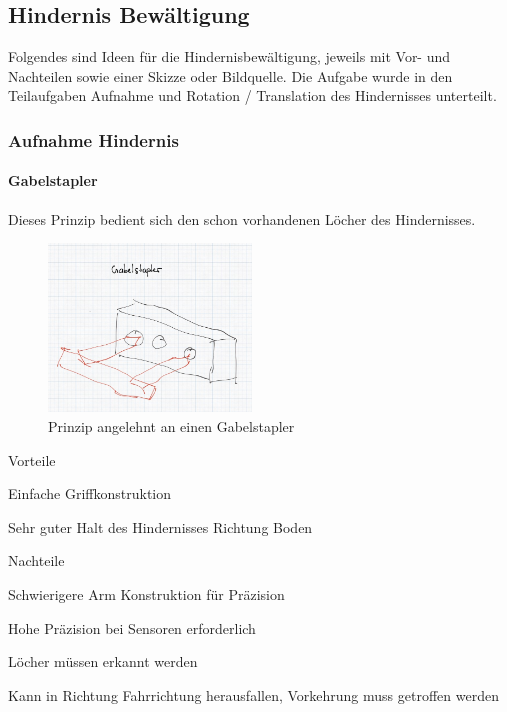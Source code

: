 \documentclass[../main.tex]{subfiles}
\begin{document}
\newpage
\subsection{Hindernis Bewältigung}
Folgendes sind Ideen für die Hindernisbewältigung, jeweils mit Vor- und Nachteilen sowie einer Skizze oder Bildquelle. Die Aufgabe wurde in den Teilaufgaben Aufnahme und Rotation / Translation des Hindernisses unterteilt. 

\subsubsection{Aufnahme Hindernis}
\paragraph{Gabelstapler}
Dieses Prinzip bedient sich den schon vorhandenen Löcher des Hindernisses.

\begin{figure}[h!]
        \centering
        \includegraphics[width=0.48\textwidth]{img/technologierecherche/Aufnahme/Gabelstapler.jpg}
        \caption{Prinzip angelehnt an einen Gabelstapler}
        \label{img:tech_Gaplerstapler}
\end{figure}

\begin{minipage}[t]{0.48\textwidth}
    \begin{items}
          \item [Vorteile]
          \item Einfache Griffkonstruktion
          \item Sehr guter Halt des Hindernisses Richtung Boden
    \end{items}
\end{minipage}
\hfill
\begin{minipage}[t]{0.48\textwidth}
    \begin{items}
          \item [Nachteile]
          \item Schwierigere Arm Konstruktion für Präzision
          \item Hohe Präzision bei Sensoren erforderlich
          \item Löcher müssen erkannt werden
          \item Kann in Richtung Fahrrichtung herausfallen, Vorkehrung muss getroffen werden
    \end{items}
\end{minipage}
\newpage
\end{document}
